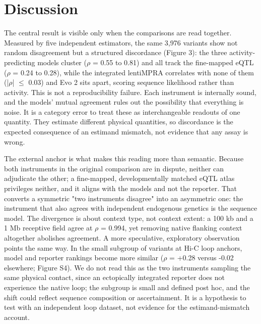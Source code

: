 \documentclass[9pt,twocolumn]{article}
\begin{document}
\section{Discussion}

The central result is visible only when the comparisons are read together. Measured by five independent estimators, the same 3,976 variants show not random disagreement but a structured discordance (Figure 3): the three activity-predicting models cluster ($\rho$ = 0.55 to 0.81) and all track the fine-mapped eQTL ($\rho$ = 0.24 to 0.28), while the integrated lentiMPRA correlates with none of them (|$\rho$| $\le$ 0.03) and Evo 2 sits apart, scoring sequence likelihood rather than activity. This is not a reproducibility failure. Each instrument is internally sound, and the models' mutual agreement rules out the possibility that everything is noise. It is a category error to treat these as interchangeable readouts of one quantity. They estimate different physical quantities, so discordance is the expected consequence of an estimand mismatch, not evidence that any assay is wrong.

The external anchor is what makes this reading more than semantic. Because both instruments in the original comparison are in dispute, neither can adjudicate the other; a fine-mapped, developmentally matched eQTL atlas privileges neither, and it aligns with the models and not the reporter. That converts a symmetric "two instruments disagree" into an asymmetric one: the instrument that also agrees with independent endogenous genetics is the sequence model. The divergence is about context type, not context extent: a 100 kb and a 1 Mb receptive field agree at $\rho$ = 0.994, yet removing native flanking context altogether abolishes agreement. A more speculative, exploratory observation points the same way. In the small subgroup of variants at Hi-C loop anchors, model and reporter rankings become more similar ($\rho$ = +0.28 versus -0.02 elsewhere; Figure S4). We do not read this as the two instruments sampling the same physical contact, since an ectopically integrated reporter does not experience the native loop; the subgroup is small and defined post hoc, and the shift could reflect sequence composition or ascertainment. It is a hypothesis to test with an independent loop dataset, not evidence for the estimand-mismatch account.
\end{document}
